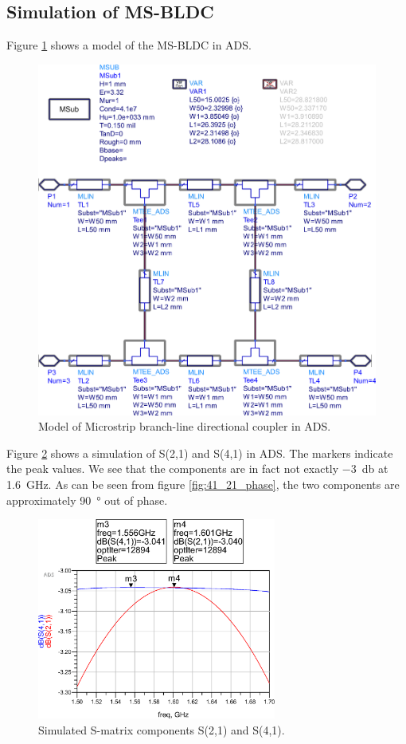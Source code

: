 \subsection{Simulation of MS-BLDC}

Figure \ref{fig:msbldc-model} shows a model of the MS-BLDC in ADS.

\begin{figure}[h t b p]
	\centering
	\includegraphics[width=\textwidth,keepaspectratio]{figures/msbldc-model.eps}
	\caption{Model of Microstrip branch-line directional coupler in ADS.}
	\label{fig:msbldc-model}
\end{figure}

Figure \ref{fig:41_21_3dB} shows a simulation of S(2,1) and S(4,1) in ADS.
The markers indicate the peak values.
We see that the components are in fact not exactly \SI{-3}{\decibel} at \SI{1.6}{\giga\hertz}.
As can be seen from figure \ref{fig:41_21_phase}, the two components are approximately \SI{90}{\degree} out of phase.

\begin{figure}[h t b p]
	\centering
	\includegraphics[width=0.7\textwidth,keepaspectratio]{figures/41_21_3dB.eps}
	\caption{Simulated S-matrix components S(2,1) and S(4,1).}
	\label{fig:41_21_3dB}
\end{figure}

